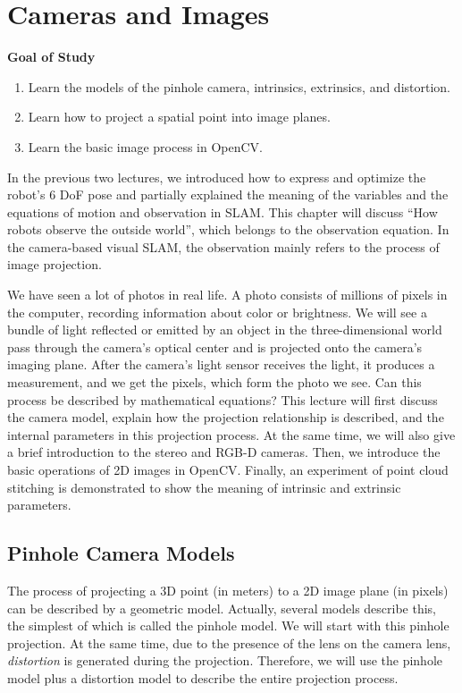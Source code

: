 \chapter{Cameras and Images}
\label{cpt:5}
\begin{mdframed}  
	\textbf{Goal of Study}
	\begin{enumerate}[labelindent=0em,leftmargin=1.5em]
		\item Learn the models of the pinhole camera, intrinsics, extrinsics, and distortion. 
		\item Learn how to project a spatial point into image planes. 
		\item Learn the basic image process in OpenCV. 
	\end{enumerate}
\end{mdframed} 

In the previous two lectures, we introduced how to express and optimize the robot's 6 DoF pose and partially explained the meaning of the variables and the equations of motion and observation in SLAM. This chapter will discuss ``How robots observe the outside world'', which belongs to the observation equation. In the camera-based visual SLAM, the observation mainly refers to the process of image projection.

We have seen a lot of photos in real life. A photo consists of millions of pixels in the computer, recording information about color or brightness. We will see a bundle of light reflected or emitted by an object in the three-dimensional world pass through the camera's optical center and is projected onto the camera's imaging plane. After the camera's light sensor receives the light, it produces a measurement, and we get the pixels, which form the photo we see. Can this process be described by mathematical equations? This lecture will first discuss the camera model, explain how the projection relationship is described, and the internal parameters in this projection process. At the same time, we will also give a brief introduction to the stereo and RGB-D cameras. Then, we introduce the basic operations of 2D images in OpenCV. Finally, an experiment of point cloud stitching is demonstrated to show the meaning of intrinsic and extrinsic parameters.

\newpage
%

\section{Pinhole Camera Models}
The process of projecting a 3D point (in meters) to a 2D image plane (in pixels) can be described by a geometric model. Actually, several models describe this, the simplest of which is called the pinhole model. We will start with this pinhole projection. At the same time, due to the presence of the lens on the camera lens, \textit{distortion} is generated during the projection. Therefore, we will use the pinhole model plus a distortion model to describe the entire projection process.

